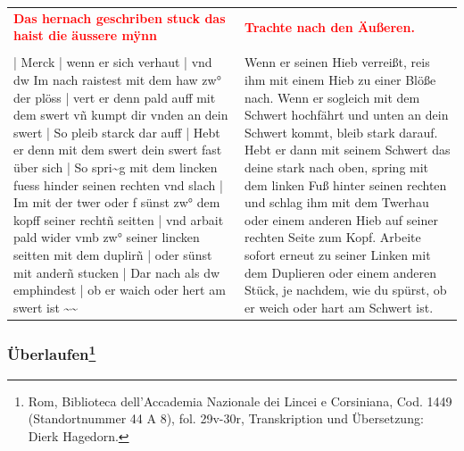 \newpage

\begin{center}
\end{center}

\newpage

\begin{longtable}{p{6.25cm}p{6.25cm}}
\textbf{\textcolor{red}{Das hernach geschriben stuck das haist die äussere mÿnn}}
&
\textbf{\textcolor{red}{Trachte nach den Äußeren.}}
\\
\\
| Merck | wenn er sich verhaut | vnd dw Im nach raistest mit dem haw zw° der plöss | vert er denn pald auff mit dem swert vñ kumpt dir vnden an dein swert | So pleib starck dar auff | Hebt er denn mit dem swert dein swert fast über sich | So spri\textasciitilde g mit dem lincken fuess hinder seinen rechten vnd slach | Im mit der twer oder f sünst zw° dem kopff seiner rechtñ seitten | vnd arbait pald wider vmb zw° seiner lincken seitten mit dem duplirñ | oder sünst mit anderñ stucken | Dar nach als dw emphindest | ob er waich oder hert am swert ist \textasciitilde \textasciitilde 
&
Wenn er seinen Hieb verreißt, reis ihm mit einem Hieb zu einer Blöße nach. Wenn er sogleich mit dem Schwert hochfährt und unten an dein Schwert kommt, bleib stark darauf. Hebt er dann mit seinem Schwert das deine stark nach oben, spring mit dem linken Fuß hinter seinen rechten und schlag ihm mit dem Twerhau oder einem anderen Hieb auf seiner rechten Seite zum Kopf. Arbeite sofort erneut zu seiner Linken mit dem Duplieren oder einem anderen Stück, je nachdem, wie du spürst, ob er weich oder hart am Schwert ist.
\end{longtable}

\newpage

\begin{center}
\end{center}

\newpage

\subsubsection[Überlaufen]{Überlaufen\footnote{\hspace*{0.5ex}Rom, Biblioteca dell'Accademia Nazionale dei Lincei e Corsiniana, Cod. 1449 (Standortnummer 44 A 8), fol. 29v-30r, Transkription und Übersetzung: Dierk Hagedorn.}}


